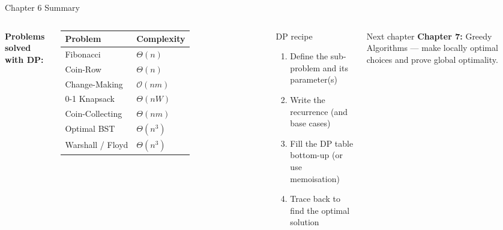 \documentclass[aspectratio=169]{beamer}
\begin{document}
\begin{frame}[shrink=12]{Chapter 6 Summary}
  \begin{columns}[T]
      \textbf{Problems solved with DP:}
      \begin{tabular}{ll}
        \toprule
        Problem & Complexity \\
        \midrule
        Fibonacci    & $\Theta(n)$ \\
        Coin-Row     & $\Theta(n)$ \\
        Change-Making & $\mathcal{O}(nm)$ \\
        0-1 Knapsack & $\Theta(nW)$ \\
        Coin-Collecting & $\Theta(nm)$ \\
        Optimal BST  & $\Theta(n^3)$ \\
        Warshall / Floyd & $\Theta(n^3)$ \\
        \bottomrule
      \end{tabular}
      \begin{block}{DP recipe}
        \begin{enumerate}
          \item Define the sub-problem and its parameter(s)
          \item Write the recurrence (and base cases)
          \item Fill the DP table bottom-up (or use memoisation)
          \item Trace back to find the optimal solution
        \end{enumerate}
      \end{block}
      \vspace{0.2em}
      \begin{block}{Next chapter}
        \textbf{Chapter 7:} Greedy Algorithms — make
        locally optimal choices and prove global optimality.
      \end{block}
  \end{columns}
\end{frame}
\end{document}
